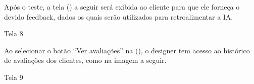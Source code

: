 Após o teste, a tela () a seguir será exibida ao cliente para que ele forneça o devido feedback, dados os quais serão utilizados para retroalimentar a IA. 

\begin{photograph}[H]
    \centering
    \caption{Tela 8}%
    \label{phot:pg-tela8}
    \end{photograph}

Ao selecionar o botão “Ver avaliações” na (), o designer tem acesso ao histórico de avaliações dos clientes, como na imagem a seguir. 

\begin{photograph}[H]
    \centering
    \caption{Tela 9}%
    \label{phot:pg-tela9}
    \end{photograph}